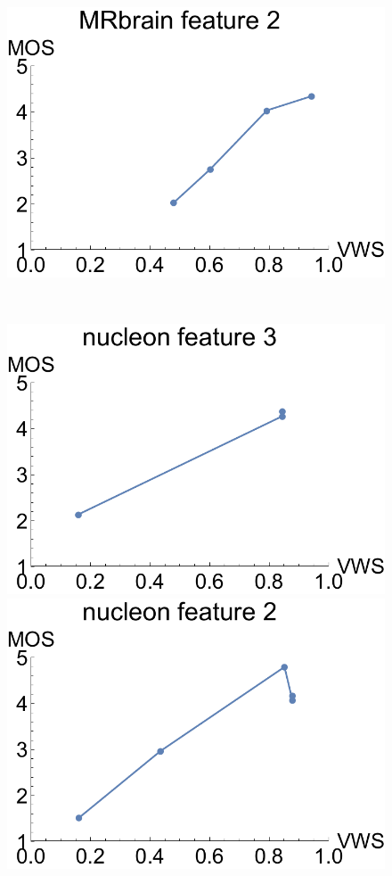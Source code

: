 \begin{figure}
\begin{minipage}{.25\textwidth}
		\includegraphics[width=1\linewidth]{figures/mos_vs_metric_MRbrain_feature_2}
		\subcaption{}
	\end{minipage}~
	\begin{minipage}{.25\textwidth}
		\includegraphics[width=1\linewidth]{figures/mos_vs_metric_nucleon_feature_3}
		\subcaption{}
	\end{minipage}
	\begin{minipage}{.25\textwidth}
		\includegraphics[width=1\linewidth]{figures/mos_vs_metric_nucleon_feature_2}

\end{minipage}
\end{figure}
